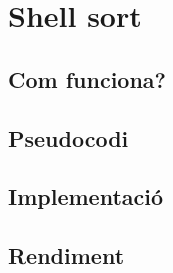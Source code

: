 \chapter{Shell sort}
\section{Com funciona?}
\section{Pseudocodi}
\section{Implementació}

\section{Rendiment}
